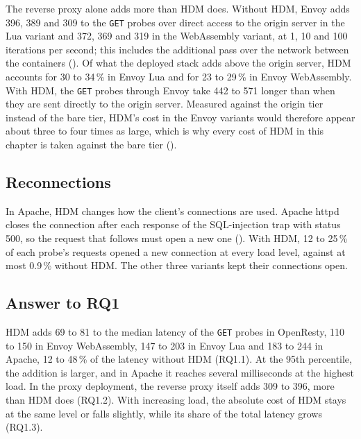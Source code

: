 \documentclass{rptuma}
\begin{document}
The reverse proxy alone adds more than HDM does. Without HDM, Envoy adds
396, 389 and 309\us{} to the \texttt{GET} probes over direct access to the origin server in the Lua
variant and 372, 369 and 319\us{} in the WebAssembly variant, at 1, 10 and 100 iterations per
second; this includes the additional pass over the network between the containers
(). Of what the deployed stack adds above the origin server, HDM
accounts for 30 to 34\,\% in Envoy Lua and for 23 to 29\,\% in Envoy WebAssembly. With HDM, the
\texttt{GET} probes through Envoy take 442 to 571\us{} longer than when they are sent directly to the
origin server. Measured against the origin tier instead of the bare tier, HDM's cost in the Envoy variants
would therefore appear about three to four times as large, which is why every cost of HDM in this chapter
is taken against the bare tier ().

\subsection{Reconnections}
\label{sec:results.reconnect}

In Apache, HDM changes how the client's connections are used. Apache httpd closes the
connection after each response of the SQL-injection trap with status 500, so the request that
follows must open a new one (). With HDM, 12 to 25\,\% of each
probe's requests opened a new connection at every load level, against at most 0.9\,\% without HDM.
The other three variants kept their connections open.

\subsection{Answer to RQ1}

HDM adds 69 to 81\us{} to the median latency of the \texttt{GET} probes in OpenResty, 110 to
150\us{} in Envoy WebAssembly, 147 to 203\us{} in Envoy Lua and 183 to 244\us{} in Apache,
12 to 48\,\% of the latency without HDM (RQ1.1). At the 95th percentile, the addition is larger,
and in Apache it reaches several milliseconds at the highest load. In the proxy
deployment, the reverse proxy itself adds 309 to 396\us, more than HDM does (RQ1.2). With increasing load, the
absolute cost of HDM stays at the same level or falls slightly, while its share of the total
latency grows (RQ1.3).

\end{document}
